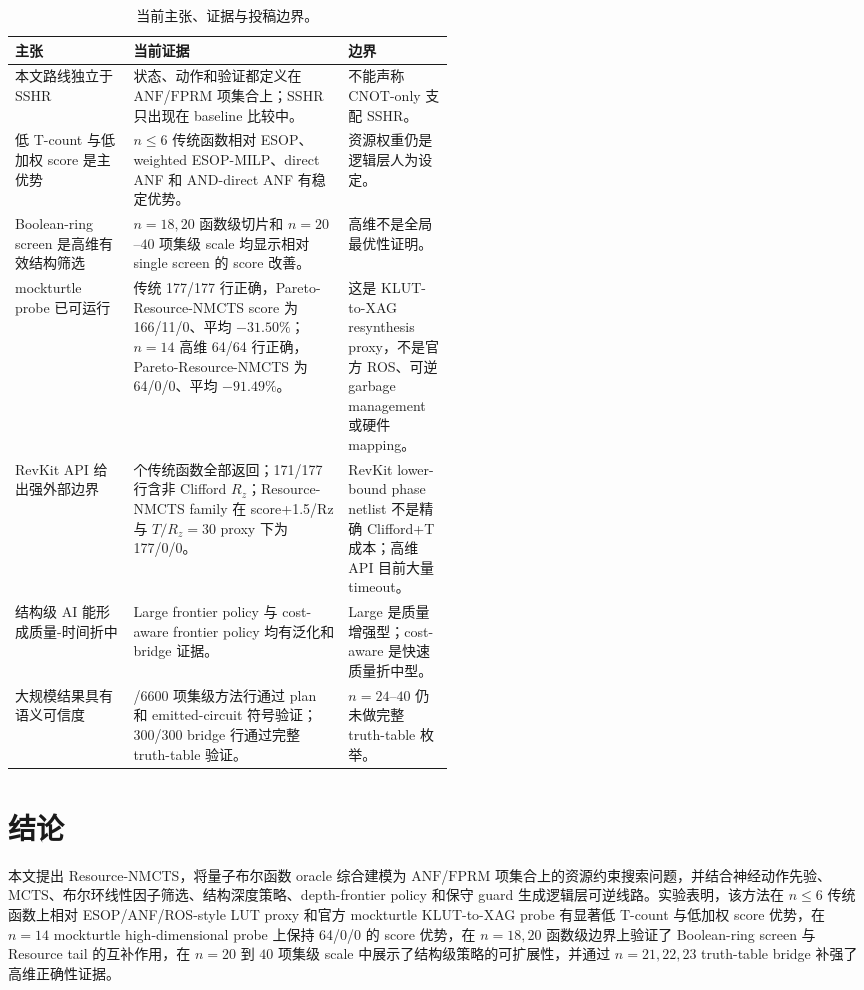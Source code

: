 \documentclass[UTF8,fontset=macnew,11pt]{ctexart}
\newcommand{\method}{Resource-NMCTS}
\newcommand{\screen}{Boolean-ring screen}
\newcommand{\anf}{\ensuremath{\mathrm{ANF}}}
\newcommand{\fprm}{\ensuremath{\mathrm{FPRM}}}
\newcommand{\mcts}{\ensuremath{\mathrm{MCTS}}}
\newcommand{\ttable}{truth-table}
\begin{document}
\begin{table}[H]
\centering
\small
\caption{当前主张、证据与投稿边界。}
\label{tab:evidence-map-v27}
\begin{tabularx}{\linewidth}{>{\raggedright\arraybackslash}p{0.27\linewidth}>{\raggedright\arraybackslash}X>{\raggedright\arraybackslash}p{0.24\linewidth}}
\toprule
主张 & 当前证据 & 边界 \\
\midrule
本文路线独立于 SSHR & 状态、动作和验证都定义在 \anf{}/\fprm{} 项集合上；SSHR 只出现在 baseline 比较中。 & 不能声称 CNOT-only 支配 SSHR。 \\
低 T-count 与低加权 score 是主优势 & $n\leq6$ 传统函数相对 ESOP、weighted ESOP-MILP、direct ANF 和 AND-direct ANF 有稳定优势。 & 资源权重仍是逻辑层人为设定。 \\
\screen{} 是高维有效结构筛选 & $n=18,20$ 函数级切片和 $n=20$--$40$ 项集级 scale 均显示相对 single screen 的 score 改善。 & 高维不是全局最优性证明。 \\
mockturtle probe 已可运行 & 传统 177/177 行正确，Pareto-\method{} score 为 166/11/0、平均 $-31.50\%$；$n=14$ 高维 64/64 行正确，Pareto-\method{} 为 64/0/0、平均 $-91.49\%$。 & 这是 KLUT-to-XAG resynthesis proxy，不是官方 ROS、可逆 garbage management 或硬件 mapping。 \\
RevKit API 给出强外部边界 & 177 个传统函数全部返回；171/177 行含非 Clifford $R_z$；Resource-NMCTS family 在 score+1.5/Rz 与 $T/R_z=30$ proxy 下为 177/0/0。 & RevKit lower-bound phase netlist 不是精确 Clifford+T 成本；高维 API 目前大量 timeout。 \\
结构级 AI 能形成质量-时间折中 & Large frontier policy 与 cost-aware frontier policy 均有泛化和 bridge 证据。 & Large 是质量增强型；cost-aware 是快速质量折中型。 \\
大规模结果具有语义可信度 & 6600/6600 项集级方法行通过 plan 和 emitted-circuit 符号验证；300/300 bridge 行通过完整 \ttable{} 验证。 & $n=24$--$40$ 仍未做完整 \ttable{} 枚举。 \\
\bottomrule
\end{tabularx}
\end{table}

\section{结论}

本文提出 \method{}，将量子布尔函数 oracle 综合建模为 \anf{}/\fprm{} 项集合上的资源约束搜索问题，并结合神经动作先验、\mcts{}、布尔环线性因子筛选、结构深度策略、depth-frontier policy 和保守 guard 生成逻辑层可逆线路。实验表明，该方法在 $n\leq6$ 传统函数上相对 ESOP/ANF/ROS-style LUT proxy 和官方 mockturtle KLUT-to-XAG probe 有显著低 T-count 与低加权 score 优势，在 $n=14$ mockturtle high-dimensional probe 上保持 64/0/0 的 score 优势，在 $n=18,20$ 函数级边界上验证了 \screen{} 与 Resource tail 的互补作用，在 $n=20$ 到 $40$ 项集级 scale 中展示了结构级策略的可扩展性，并通过 $n=21,22,23$ truth-table bridge 补强了高维正确性证据。
\end{document}
